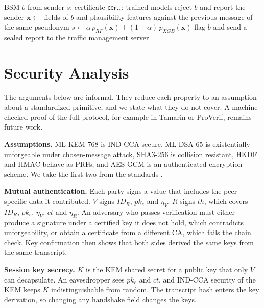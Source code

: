\documentclass[journal,twoside]{IEEEtran}
\begin{document}
\begin{algorithm}[!t]
\caption{Per-message processing at the RSU}
\label{alg:ids}
\begin{algorithmic}[1]
\REQUIRE BSM $b$ from sender $s$; certificate $\mathsf{cert}_s$; trained models
  \STATE reject $b$ and report the sender
\ELSE
  \STATE $\mathbf{x}\leftarrow$ fields of $b$ and plausibility features against the previous message of the same pseudonym
  \STATE $s\leftarrow\alpha\,p_{RF}(\mathbf{x})+(1-\alpha)\,p_{XGB}(\mathbf{x})$
    \STATE flag $b$ and send a sealed report to the traffic management server
  \ENDIF
\ENDIF
\end{algorithmic}
\end{algorithm}

\section{Security Analysis}
\label{sec:security}

The arguments below are informal. They reduce each property to an assumption about a standardized primitive, and we state what they do not cover. A machine-checked proof of the full protocol, for example in Tamarin or ProVerif, remains future work.

\textbf{Assumptions.} ML-KEM-768 is IND-CCA secure, ML-DSA-65 is existentially unforgeable under chosen-message attack, SHA3-256 is collision resistant, HKDF and HMAC behave as PRFs, and AES-GCM is an authenticated encryption scheme. We take the first two from the standards \cite{fips203,fips204}.

\textbf{Mutual authentication.} Each party signs a value that includes the peer-specific data it contributed. $V$ signs $ID_R$, $pk_e$ and $\eta_V$. $R$ signs $th$, which covers $ID_R$, $pk_e$, $\eta_V$, $ct$ and $\eta_R$. An adversary who passes verification must either produce a signature under a certified key it does not hold, which contradicts unforgeability, or obtain a certificate from a different CA, which fails the chain check. Key confirmation then shows that both sides derived the same keys from the same transcript.

\textbf{Session key secrecy.} $K$ is the KEM shared secret for a public key that only $V$ can decapsulate. An eavesdropper sees $pk_e$ and $ct$, and IND-CCA security of the KEM keeps $K$ indistinguishable from random. The transcript hash enters the key derivation, so changing any handshake field changes the keys.
\end{document}
